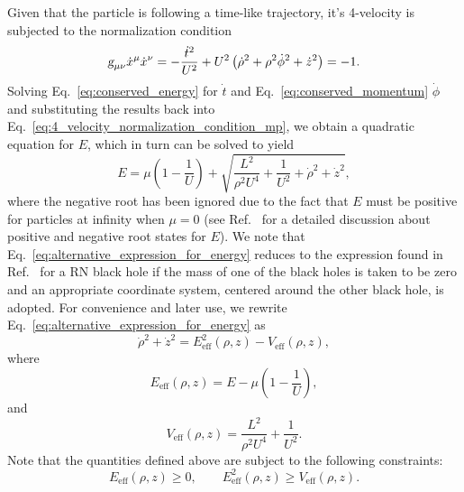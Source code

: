 Given that the particle is following a time-like trajectory, it's 4-velocity is subjected to the normalization condition
%
\begin{equation}
  \mtrtens{\mu}{\nu} \dot{x}^\mu \dot{x}^\nu = -\frac{\dot{t}^2}{U^2} + U^2\left( \dot{\rho}^2 + \rho^2\dot{\phi}^2 + \dot{z}^2 \right) = -1.
  \label{eq:4_velocity_normalization_condition_mp}
\end{equation}
%
Solving Eq.~\eqref{eq:conserved_energy} for $\dot{t}$ and Eq.~\eqref{eq:conserved_momentum} $\dot{\phi}$ and substituting the results back into Eq.~\eqref{eq:4_velocity_normalization_condition_mp}, we obtain a quadratic equation for $E$, which in turn can be solved to yield
%
\begin{equation}
  E = \mu\left(1-\frac{1}{U}\right) + \sqrt{\frac{L^2}{\rho^2U^4} + \frac{1}{U^2} + \dot{\rho}^2 + \dot{z}^2},
  \label{eq:alternative_expression_for_energy}
\end{equation}
%
where the negative root has been ignored due to the fact that $E$ must be positive for particles at infinity when $\mu = 0$ (see Ref.~\cite{RUFFINI1971} for a detailed discussion about positive and negative root states for $E$). We note that Eq.~\eqref{eq:alternative_expression_for_energy} reduces to the expression found in Ref.~\cite{DENARDO1973} for a RN black hole if the mass of one of the black holes is taken to be zero and an appropriate coordinate system, centered around the other black hole, is adopted. For convenience and later use, we rewrite Eq.~\eqref{eq:alternative_expression_for_energy} as
\begin{equation} \label{eq:effective1}
  \dot{\rho}^2 + \dot{z}^2 = E_{\mathrm {eff}}^2(\rho,z) - V_{\mathrm {eff}}(\rho,z),
\end{equation}
where
\begin{equation} \label{eq:effective2}
  E_{\mathrm {eff}}(\rho,z) = E - \mu\left(1-\frac{1}{U}\right),
\end{equation}
and
\begin{equation} \label{eq:effective3}
  V_{\mathrm {eff}}(\rho,z) =\frac{L^2}{\rho^2U^4} + \frac{1}{U^2}.
\end{equation}
Note that the quantities defined above are subject to the following constraints:
\begin{equation} \label{eq:effective_constraints}
  E_{\mathrm {eff}}(\rho,z) \ge 0, \qquad E_{\mathrm {eff}}^2(\rho,z) \ge V_{\mathrm {eff}}(\rho,z).
\end{equation}

